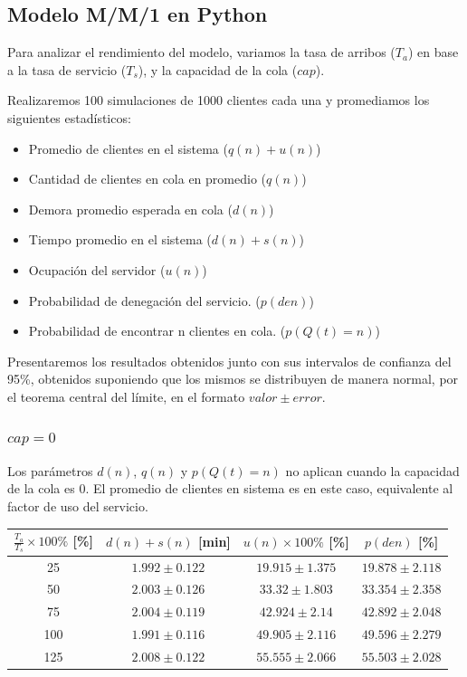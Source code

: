 \subsection{Modelo M/M/1 en Python}

Para analizar el rendimiento del modelo, variamos la tasa de arribos ($T_a$) en base a la tasa de servicio ($T_s$), y
la capacidad de la cola ($cap$).

Realizaremos 100 simulaciones de 1000 clientes cada una y promediamos los siguientes estadísticos:
\begin{itemize}
    \item Promedio de clientes en el sistema ($q(n)+u(n)$)
    \item Cantidad de clientes en cola en promedio ($q(n)$)
    \item Demora promedio esperada en cola ($d(n)$)
    \item Tiempo promedio en el sistema ($d(n)+s(n)$)
    \item Ocupación del servidor ($u(n)$)
    \item Probabilidad de denegación del servicio. ($p(den)$)
    \item Probabilidad de encontrar n clientes en cola. ($p(Q(t)=n)$)
\end{itemize}

Presentaremos los resultados obtenidos junto con sus intervalos de confianza del 95\%, obtenidos suponiendo que los mismos se distribuyen de manera normal, por el teorema central del límite, en el formato $valor \pm error$.

\subsubsection[cap = 0]{$cap = 0$}

Los parámetros $d(n)$, $q(n)$ y $p(Q(t)=n)$ no aplican cuando la capacidad de la cola es 0. El promedio de clientes en sistema es en este caso, equivalente al factor de uso del servicio.

\begin{tabular}{||c||c|c|c||}
    \hline \hline
    $\frac{T_a}{T_s}\times100\%$ [\%] & $d(n)+s(n)$ [min] & $u(n)\times100\%$ [\%] & $p(den)$ [\%] \\
    \hline \hline
    25 & $1.992 \pm 0.122$ & $19.915 \pm 1.375$ & $19.878 \pm 2.118$ \\
    \hline
    50 & $2.003 \pm 0.126$ & $33.32 \pm 1.803$ & $33.354 \pm 2.358$ \\
    \hline
    75 & $2.004 \pm 0.119$ & $42.924 \pm 2.14$ & $42.892 \pm 2.048$ \\
    \hline
    100 & $1.991 \pm 0.116$ & $49.905 \pm 2.116$ & $49.596 \pm 2.279$ \\
    \hline
    125 & $2.008 \pm 0.122$ & $55.555 \pm 2.066$ & $55.503 \pm 2.028$ \\
    \hline \hline
\end{tabular}

